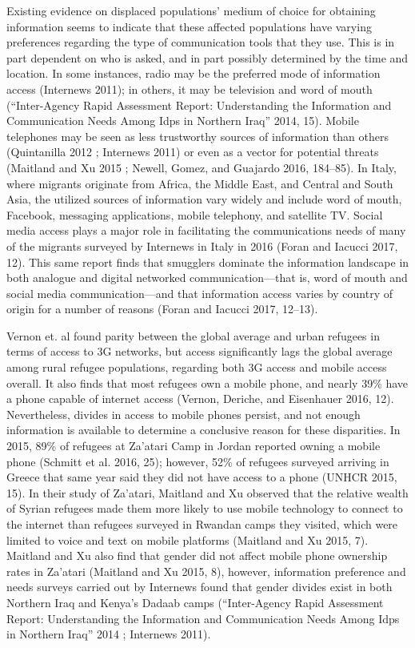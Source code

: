 Existing evidence on displaced populations' medium of choice for
obtaining information seems to indicate that these affected populations
have varying preferences regarding the type of communication tools that
they use. This is in part dependent on who is asked, and in part
possibly determined by the time and location. In some instances, radio
may be the preferred mode of information access (Internews 2011); in
others, it may be television and word of mouth (``Inter-Agency Rapid
Assessment Report: Understanding the Information and Communication Needs
Among Idps in Northern Iraq'' 2014, 15). Mobile telephones may be seen
as less trustworthy sources of information than others (Quintanilla 2012
; Internews 2011) or even as a vector for potential threats (Maitland
and Xu 2015 ; Newell, Gomez, and Guajardo 2016, 184--85). In Italy,
where migrants originate from Africa, the Middle East, and Central and
South Asia, the utilized sources of information vary widely and include
word of mouth, Facebook, messaging applications, mobile telephony, and
satellite TV. Social media access plays a major role in facilitating the
communications needs of many of the migrants surveyed by Internews in
Italy in 2016 (Foran and Iacucci 2017, 12). This same report finds that
smugglers dominate the information landscape in both analogue and
digital networked communication---that is, word of mouth and social
media communication---and that information access varies by country of
origin for a number of reasons (Foran and Iacucci 2017, 12--13).

Vernon et. al found parity between the global average and urban refugees
in terms of access to 3G networks, but access significantly lags the
global average among rural refugee populations, regarding both 3G access
and mobile access overall. It also finds that most refugees own a mobile
phone, and nearly 39\% have a phone capable of internet access (Vernon,
Deriche, and Eisenhauer 2016, 12). Nevertheless, divides in access to
mobile phones persist, and not enough information is available to
determine a conclusive reason for these disparities. In 2015, 89\% of
refugees at Za'atari Camp in Jordan reported owning a mobile phone
(Schmitt et al. 2016, 25); however, 52\% of refugees surveyed arriving
in Greece that same year said they did not have access to a phone (UNHCR
2015, 15). In their study of Za'atari, Maitland and Xu observed that the
relative wealth of Syrian refugees made them more likely to use mobile
technology to connect to the internet than refugees surveyed in Rwandan
camps they visited, which were limited to voice and text on mobile
platforms (Maitland and Xu 2015, 7). Maitland and Xu also find that
gender did not affect mobile phone ownership rates in Za'atari (Maitland
and Xu 2015, 8), however, information preference and needs surveys
carried out by Internews found that gender divides exist in both
Northern Iraq and Kenya's Dadaab camps (``Inter-Agency Rapid Assessment
Report: Understanding the Information and Communication Needs Among Idps
in Northern Iraq'' 2014 ; Internews 2011).

